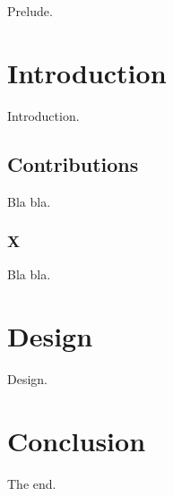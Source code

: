 Prelude.

\section{Introduction}
Introduction.

\subsection{Contributions}
Bla bla.

\subsubsection{X}
Bla bla.

\section{Design}
Design.

\section{Conclusion}
The end.

